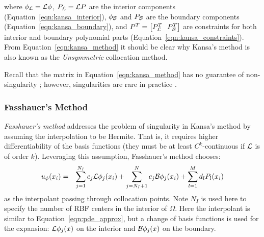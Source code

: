\documentclass[11pt]{report}
\begin{document}
{where $\phi_{\mathcal{L}} = \mathcal{L}\phi$, $P_{\mathcal{L}} = \mathcal{L}P$ are the interior components (Equation~\ref{eqn:kansa_interior}), $\phi_{\mathcal{B}}$ and $P_{\mathcal{B}}$ are the boundary components (Equation~\ref{eqn:kansa_boundary}), and $P^T = \left[P_\diffop{}^T \ \ P_\boundop{}^T\right]$ are constraints for both interior and boundary polynomial parts (Equation~\ref{eqn:kansa_constraints}). From Equation~\ref{eqn:kansa_method} it should be clear why Kansa's method is also known as the \emph{Unsymmetric} collocation method. 

Recall that the matrix in Equation~\ref{eqn:kansa_method} has no guarantee of non-singularity \cite{Fasshauer1997}; however, singularities are rare in practice \cite{Larsson2003}. 

\subsubsection{Fasshauer's Method}

\emph{Fasshauer's method} \cite{Fasshauer1997} addresses the problem of singularity in Kansa's method by assuming the interpolation to be Hermite. That is, it requires higher differentiability of the basis functions (they must be at least $C^k$-continuous if $\mathcal{L}$ is of order $k$). Leveraging this assumption, Fasshauer's method chooses: 
\begin{eqnarray}
u_\phi(x_i) & = & \sum_{j=1}^{N_I}  c_j \mathcal{L}\phi_j(x_i) + \sum_{j=N_{I} + 1}^{N} c_j \mathcal{B}\phi_j(x_i) + \sum_{l=1}^{M}d_l P_l(x_i)
\label{eqn:fasshauer_approx}
\end{eqnarray}
as the interpolant passing through collocation points. Note $N_I$ is used here to specify the number of RBF centers in the interior of $\Omega$. Here the interpolant is similar to Equation~\ref{eqn:pde_approx}, but a change of basis functions is used for the expansion: $\mathcal{L}\phi_j(x)$ on the interior and $\mathcal{B}\phi_j(x)$ on the boundary.

}
\end{document}
